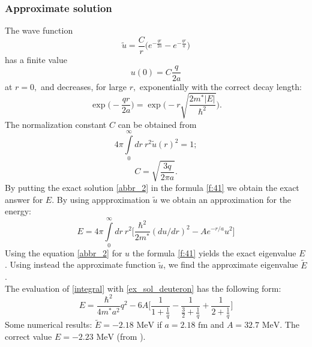\documentclass[a4paper, 11pt]{article}
\begin{document}
\subsubsection{Approximate solution}
The wave function
$$\widetilde{u} = \frac{C}{r}\displaystyle{\big(e^{-\frac{qr}{2a}} - e^{-\frac{qr}{a}}\big)} $$
has a finite value
$$u(0) = C\frac{q}{2a}$$
at $r=0,$ and decreases, for large $r,$ exponentially with the correct decay length:
$$\exp\bigg(-\frac{qr}{2a}\bigg) = \exp\bigg(-r \sqrt{\frac{2 m^* |E|}{\hbar^2}}\bigg).$$
The normalization constant $C$ can be obtained from 
$$4 \pi \displaystyle{\int\limits_{0}^ {\infty}} dr~ r^2 \widetilde{u}(r)^2 = 1;$$
\begin{equation}\label{f:41}
    C = \sqrt{\frac{3q}{2 \pi a}}.
\end{equation}
By putting the exact solution \eqref{abbr_2} in the formula \eqref{f:41} we obtain the exact answer for $E$. By using appproximation $\widetilde{u}$ we obtain an approximation for the energy:
\begin{equation}\label{integral}
    E = 4 \pi \int\limits_{0}^{\infty} dr ~r^2 \bigg[\frac{\hbar^2}{2 m^*}(du/dr)^2 -A e ^{-r/a} u^2\bigg]
\end{equation}
Using the equation \eqref{abbr_2}  for $u$ the formula \eqref{f:41} yields the exact eigenvalue $E$. Using instead the approximate function $\widetilde{u}$, we find the approximate eigenvalue $\widetilde{E}$.\\
The evaluation of \eqref{integral} with \eqref{ex_sol_deuteron} has the following form:
\begin{equation}
    E = \frac{\hbar^2}{4 m^* a^2}q^2 - 6 A \bigg[\frac{1}{1 + \frac{1}{q}} - \frac{1}{\frac{3}{2} + \frac{1}{q}} +  \frac{1}{2 + \frac{1}{q}} \bigg]
\end{equation}
Some numerical results: $\widetilde{E}=-2.18 \text{ MeV}$ if $a = 2.18 \text{ fm}$ and $A = 32.7 \text{ MeV}$. The correct value $E = -2.23 \text{ MeV}$ (from \cite{griffiths2016introduction}).
\end{document}
